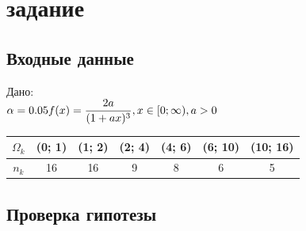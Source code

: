 \documentclass[a4paper,14pt]{extarticle}
\begin{document}
	\newpage

	\section{задание}

	\subsection{Входные данные}

	Дано: \\
	$\displaystyle
	\alpha = 0.05 \\
	f(x) = \frac{2a}{(1 + ax)^3}, x \in [0; \infty), a > 0 \\
	$
	\begin{table}[h]
		\begin{tabular}{|c|c|c|c|c|c|c|}
			\hline
			$\Omega_k$ & (0; 1) & (1; 2) & (2; 4) & (4; 6) & (6; 10) & (10; 16) \\ \hline
			$n_k$      & 16     & 16     & 9      & 8      & 6       & 5        \\ \hline
		\end{tabular}
	\end{table}

	\subsection{Проверка гипотезы}
\end{document}
